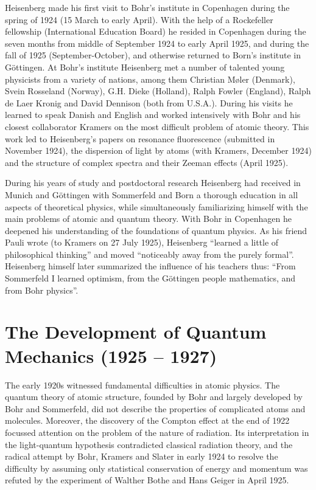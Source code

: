 \documentclass{article}
\begin{document}
Heisenberg made his first visit to Bohr's institute in Copenhagen during the spring of 1924 (15 March to early April). With the help of a Rockefeller fellowship (International Education Board) he resided in Copenhagen during the seven months from middle of September 1924 to early April 1925, and during the fall of 1925 (September-October), and otherwise returned to Born's institute in Göttingen. At Bohr's institute Heisenberg met a number of talented young physicists from a variety of nations, among them Christian Møler (Denmark), Svein Rosseland (Norway), G.H. Dieke (Holland), Ralph Fowler (England), Ralph de Laer Kronig and David Dennison (both from U.S.A.). During his visits he learned to speak Danish and English and worked intensively with Bohr and his closest collaborator Kramers on the most difficult problem of atomic theory. This work led to Heisenberg's papers on resonance fluorescence (submitted in November 1924), the dispersion of light by atoms (with Kramers, December 1924) and the structure of complex spectra and their Zeeman effects (April 1925).

During his years of study and postdoctoral research Heisenberg had received in Munich and Göttingen with Sommerfeld and Born a thorough education in all aspects of theoretical physics, while simultaneously familiarizing himself with the main problems of atomic and quantum theory. With Bohr in Copenhagen he deepened his understanding of the foundations of quantum physics. As his friend Pauli wrote (to Kramers on 27 July 1925), Heisenberg “learned a little of philosophical thinking” and moved “noticeably away from the purely formal”. Heisenberg himself later summarized the influence of his teachers thus: “From Sommerfeld I learned optimism, from the Göttingen people mathematics, and from Bohr physics”.

\section{The Development of Quantum Mechanics (1925 – 1927)}

The early 1920s witnessed fundamental difficulties in atomic physics. The quantum theory of atomic structure, founded by Bohr and largely developed by Bohr and Sommerfeld, did not describe the properties of complicated atoms and molecules. Moreover, the discovery of the Compton effect at the end of 1922 focussed attention on the problem of the nature of radiation. Its interpretation in the light-quantum hypothesis contradicted classical radiation theory, and the radical attempt by Bohr, Kramers and Slater in early 1924 to resolve the difficulty by assuming only statistical conservation of energy and momentum was refuted by the experiment of Walther Bothe and Hans Geiger in April 1925.
\end{document}
